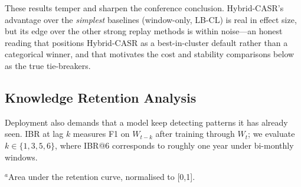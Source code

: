 \documentclass[a4paper,twoside]{article}
\begin{document}
These results temper and sharpen the conference conclusion. Hybrid-CASR's advantage over the \emph{simplest} baselines (window-only, LB-CL) is real in effect size, but its edge over the other strong replay methods is within noise---an honest reading that positions Hybrid-CASR as a best-in-cluster default rather than a categorical winner, and that motivates the cost and stability comparisons below as the true tie-breakers.

\subsection{Knowledge Retention Analysis}
\label{sec:retention}

\noindent
Deployment also demands that a model keep detecting patterns it has already seen. IBR at lag $k$ measures F1 on $W_{t-k}$ after training through $W_t$; we evaluate $k\in\{1,3,5,6\}$, where IBR@6 corresponds to roughly one year under bi-monthly windows.

\begin{table}[t]
  \centering
  \caption{Knowledge retention by Immediate Backward Retention at multiple lags. Decay rate $=(\mathrm{IBR@1}-\mathrm{IBR@6})/\mathrm{IBR@1}$. Reproduced from the conference version~\citep{Dou2026ICISSP}.}
  \label{tab:retention-detailed}
  \vspace{1mm}
  {\footnotesize $^a$Area under the retention curve, normalised to [0,1].}
\end{table}
\end{document}

